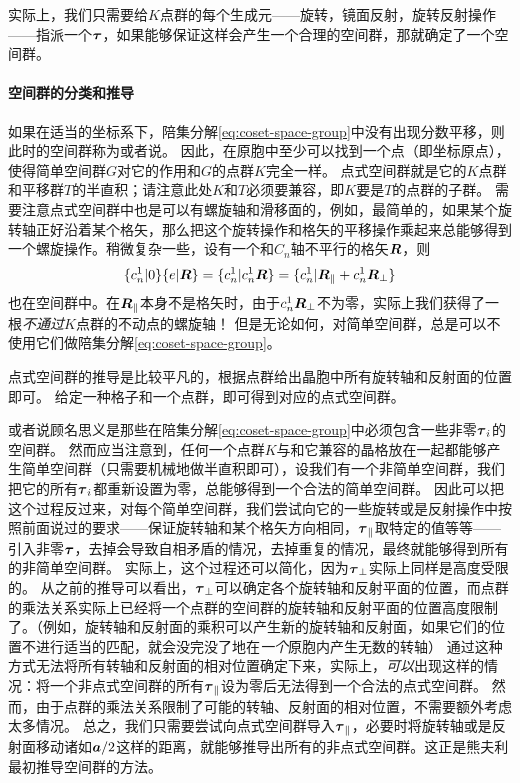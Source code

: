实际上，我们只需要给$K$点群的每个生成元——旋转，镜面反射，旋转反射操作——指派一个$\vb*{\tau}$，如果能够保证这样会产生一个合理的空间群，那就确定了一个空间群。

\paragraph{空间群的分类和推导} 如果在适当的坐标系下，陪集分解\eqref{eq:coset-space-group}中没有出现分数平移，则此时的空间群称为或者说。
因此，在原胞中至少可以找到一个点（即坐标原点），使得简单空间群$G$对它的作用和$G$的点群$K$完全一样。
点式空间群就是它的$K$点群和平移群$T$的半直积；请注意此处$K$和$T$必须要兼容，即$K$要是$T$的点群的子群。
需要注意点式空间群中也是可以有螺旋轴和滑移面的，例如，最简单的，如果某个旋转轴正好沿着某个格矢，那么把这个旋转操作和格矢的平移操作乘起来总能够得到一个螺旋操作。稍微复杂一些，设有一个和$C_n$轴不平行的格矢$\vb*{R}$，则
\[
    \{c_n^1 | 0\} \{ e | \vb*{R} \} = \{ c_n^1 | c_n^1 \vb*{R} \} = \{ c_n^1 | \vb*{R}_\parallel + c_n^1 \vb*{R}_\bot \}
\]
也在空间群中。在$\vb*{R}_\parallel$本身不是格矢时，由于$c_n^1 \vb*{R}_\bot$不为零，实际上我们获得了一根\emph{不通过}$K$点群的不动点的螺旋轴！
但是无论如何，对简单空间群，总是可以不使用它们做陪集分解\eqref{eq:coset-space-group}。

点式空间群的推导是比较平凡的，根据点群给出晶胞中所有旋转轴和反射面的位置即可。
给定一种格子和一个点群，即可得到对应的点式空间群。

或者说顾名思义是那些在陪集分解\eqref{eq:coset-space-group}中必须包含一些非零$\vb*{\tau}_i$的空间群。
然而应当注意到，任何一个点群$K$与和它兼容的晶格放在一起都能够产生简单空间群（只需要机械地做半直积即可），设我们有一个非简单空间群，我们把它的所有$\vb*{\tau}_i$都重新设置为零，总能够得到一个合法的简单空间群。
因此可以把这个过程反过来，对每个简单空间群，我们尝试向它的一些旋转或是反射操作中按照前面说过的要求——保证旋转轴和某个格矢方向相同，$\vb*{\tau}_\parallel$取特定的值等等——引入非零$\vb*{\tau}$，去掉会导致自相矛盾的情况，去掉重复的情况，最终就能够得到所有的非简单空间群。
实际上，这个过程还可以简化，因为$\vb*{\tau}_\bot$实际上同样是高度受限的。
从之前的推导可以看出，$\vb*{\tau}_\bot$可以确定各个旋转轴和反射平面的位置，而点群的乘法关系实际上已经将一个点群的空间群的旋转轴和反射平面的位置高度限制了。（例如，旋转轴和反射面的乘积可以产生新的旋转轴和反射面，如果它们的位置不进行适当的匹配，就会没完没了地在\emph{一个}原胞内产生无数的转轴）
通过这种方式无法将所有转轴和反射面的相对位置确定下来，实际上，\emph{可以}出现这样的情况：将一个非点式空间群的所有$\vb*{\tau}_\parallel$设为零后无法得到一个合法的点式空间群。
然而，由于点群的乘法关系限制了可能的转轴、反射面的相对位置，不需要额外考虑太多情况。
总之，我们只需要尝试向点式空间群导入$\vb*{\tau}_\parallel$，必要时将旋转轴或是反射面移动诸如$\vb*{a}/2$这样的距离，就能够推导出所有的非点式空间群。这正是熊夫利最初推导空间群的方法。

